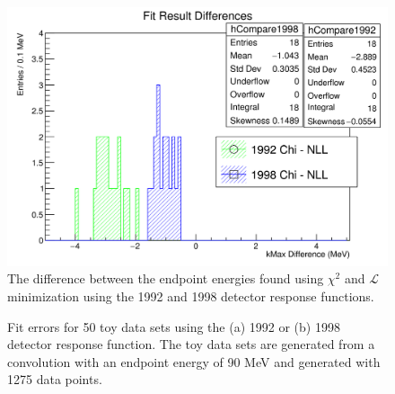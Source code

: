 \begin{figure}[h]
  \centering
  \includegraphics[width=\linewidth]{figures/png/compare_fit_results_92_v_98_unrestrictedOnly.png}
  \caption{The difference between the endpoint energies found using $\chi^2$ and
    $\mathcal{L}$ minimization using the 1992 and 1998 detector response functions.}
  \label{fig:compareFits}
\end{figure}

\begin{figure}[h]
  \centering
  \hfill
  \caption{Fit errors for 50 toy data sets using the (a) 1992 or (b) 1998 detector response function.
    The toy data sets are generated from a convolution with an endpoint energy of 90 MeV and generated
    with 1275 data points.
  }
  \label{fig:ToyFitErrs}
\end{figure}

